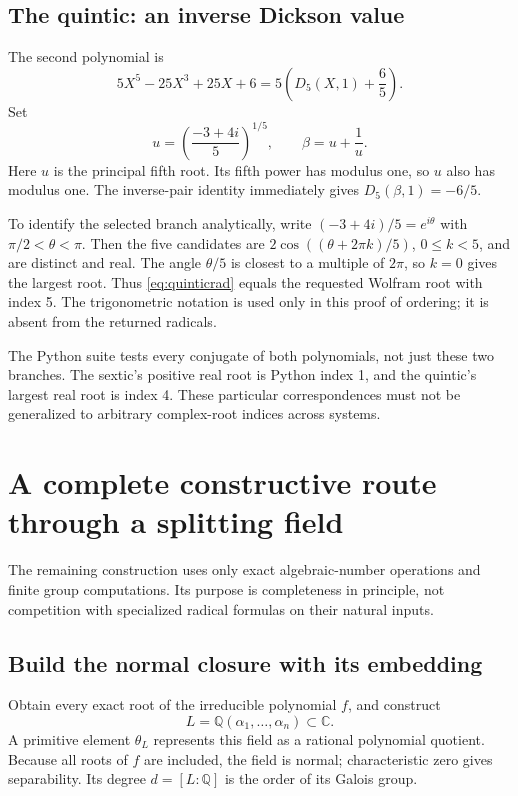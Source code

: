 \documentclass[11pt,letterpaper]{article}
\newcommand{\Q}{\mathbb Q}\newcommand{\C}{\mathbb C}
\theoremstyle{definition}\newtheorem{definition}[theorem]{Definition}
\theoremstyle{remark}\newtheorem{remark}[theorem]{Remark}
\begin{document}
\subsection{The quintic: an inverse Dickson value}

The second polynomial is
\[
           5X^5-25X^3+25X+6=5\left(D_5(X,1)+\frac65\right).
\]
Set
\begin{equation}
              u=\left(\frac{-3+4i}{5}\right)^{1/5},\qquad
              \beta=u+\frac1u.                              \label{eq:quinticrad}
\end{equation}
Here \(u\) is the principal fifth root. Its fifth power has modulus one, so
\(u\) also has modulus one. The inverse-pair identity immediately gives
\(D_5(\beta,1)=-6/5\).

To identify the selected branch analytically, write
\((-3+4i)/5=e^{i\theta}\) with \(\pi/2<\theta<\pi\). Then the five candidates
are \(2\cos((\theta+2\pi k)/5)\), \(0\leq k<5\), and are distinct and real.
The angle \(\theta/5\) is closest to a multiple of \(2\pi\), so \(k=0\)
gives the largest root. Thus \eqref{eq:quinticrad} equals the requested
Wolfram root with index 5. The trigonometric notation is used only in this
proof of ordering; it is absent from the returned radicals.

The Python suite tests every conjugate of both polynomials, not just these
two branches. The sextic's positive real root is Python index 1, and the
quintic's largest real root is index 4. These particular correspondences
must not be generalized to arbitrary complex-root indices across systems.

\section{A complete constructive route through a splitting field}
\label{sec:general}

The remaining construction uses only exact algebraic-number operations and
finite group computations. Its purpose is completeness in principle, not
competition with specialized radical formulas on their natural inputs.

\subsection{Build the normal closure with its embedding}

Obtain every exact root of the irreducible polynomial \(f\), and construct
\[
                 L=\Q(\alpha_1,\ldots,\alpha_n)\subset\C.
\]
A primitive element \(\theta_L\) represents this field as a rational
polynomial quotient. Because all roots of \(f\) are included, the field is
normal; characteristic zero gives separability. Its degree
\(d=[L:\Q]\) is the order of its Galois group.
\end{document}
